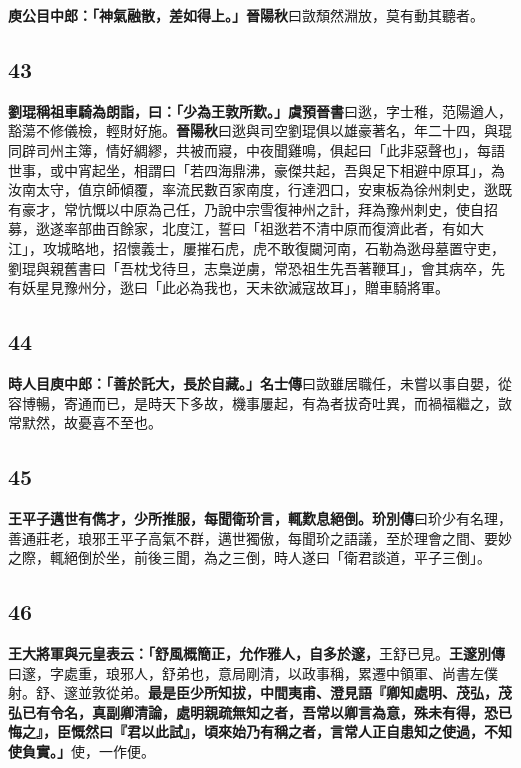 \textbf{庾公目中郎：「神氣融散，差如得上。」}{\footnotesize \textbf{晉陽秋}曰敳頹然淵放，莫有動其聽者。}

\subsection*{43}

\textbf{劉琨稱祖車騎為朗詣，曰：「少為王敦所歎。」}{\footnotesize \textbf{虞預晉書}曰逖，字士稚，范陽遒人，豁蕩不修儀檢，輕財好施。\textbf{晉陽秋}曰逖與司空劉琨俱以雄豪著名，年二十四，與琨同辟司州主簿，情好綢繆，共被而寢，中夜聞雞鳴，俱起曰「此非惡聲也」，每語世事，或中宵起坐，相謂曰「若四海鼎沸，豪傑共起，吾與足下相避中原耳」，為汝南太守，值京師傾覆，率流民數百家南度，行達泗口，安東板為徐州刺史，逖既有豪才，常忼慨以中原為己任，乃說中宗雪復神州之計，拜為豫州刺史，使自招募，逖遂率部曲百餘家，北度江，誓曰「祖逖若不清中原而復濟此者，有如大江」，攻城略地，招懷義士，屢摧石虎，虎不敢復闚河南，石勒為逖母墓置守吏，劉琨與親舊書曰「吾枕戈待旦，志梟逆虜，常恐祖生先吾著鞭耳」，會其病卒，先有妖星見豫州分，逖曰「此必為我也，天未欲滅寇故耳」，贈車騎將軍。}

\subsection*{44}

\textbf{時人目庾中郎：「善於託大，長於自藏。」}{\footnotesize \textbf{名士傳}曰敳雖居職任，未嘗以事自嬰，從容博暢，寄通而已，是時天下多故，機事屢起，有為者拔奇吐異，而禍福繼之，敳常默然，故憂喜不至也。}

\subsection*{45}

\textbf{王平子邁世有儁才，少所推服，每聞衛玠言，輒歎息絕倒。}{\footnotesize \textbf{玠別傳}曰玠少有名理，善通莊老，琅邪王平子高氣不群，邁世獨傲，每聞玠之語議，至於理會之間、要妙之際，輒絕倒於坐，前後三聞，為之三倒，時人遂曰「衛君談道，平子三倒」。}

\subsection*{46}

\textbf{王大將軍與元皇表云：「舒風概簡正，允作雅人，自多於邃，}{\footnotesize 王舒已見。\textbf{王邃別傳}曰邃，字處重，琅邪人，舒弟也，意局剛清，以政事稱，累遷中領軍、尚書左僕射。舒、邃並敦從弟。}\textbf{最是臣少所知拔，中間夷甫、澄見語『卿知處明、茂弘，茂弘已有令名，真副卿清論，處明親疏無知之者，吾常以卿言為意，殊未有得，恐已悔之』，臣慨然曰『君以此試』，頃來始乃有稱之者，言常人正自患知之使過，不知使負實。」}{\footnotesize 使，一作便。}

